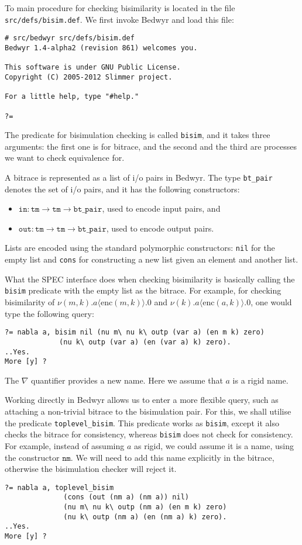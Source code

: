 \documentclass{article}
\newcommand\obj[1]{\texttt{#1}}
\begin{document}
To main procedure for checking bisimilarity is located in the file \obj{src/defs/bisim.def}.
We first invoke Bedwyr and load this file:
\begin{verbatim}
# src/bedwyr src/defs/bisim.def
Bedwyr 1.4-alpha2 (revision 861) welcomes you.

This software is under GNU Public License.
Copyright (C) 2005-2012 Slimmer project.

For a little help, type "#help."

?= 
\end{verbatim}
The predicate for bisimulation checking is called \texttt{bisim}, and it takes three
arguments: the first one is for bitrace, and the second and the third are processes
we want to check equivalence for. 

A bitrace is represented as a list of i/o pairs in Bedwyr. The type \texttt{bt\_pair}
denotes the set of i/o pairs, and it has the following constructors:
\begin{itemize}
\item $\obj{in} : \obj{tm} \to \obj{tm} \to \obj{bt\_pair}$, used to encode input pairs, and
\item $\obj{out} : \obj{tm} \to \obj{tm} \to \obj{bt\_pair}$, used to encode output pairs.
\end{itemize}
Lists are encoded using the standard polymorphic constructors: \obj{nil} for
the empty list and \obj{cons} for constructing a new list given an element and another list.

What the SPEC interface does when checking bisimilarity is basically calling the \obj{bisim}
predicate with the empty list as the bitrace.
For example, for checking bisimilarity of 
$\nu (m,k). a\langle \mathrm{enc}(m,k) \rangle.0$ and 
$\nu (k). a\langle \mathrm{enc}(a,k) \rangle.0$, one would type the following
query:
\begin{verbatim}
?= nabla a, bisim nil (nu m\ nu k\ outp (var a) (en m k) zero) 
             (nu k\ outp (var a) (en (var a) k) zero).
..Yes.
More [y] ? 
\end{verbatim}
The $\nabla$ quantifier provides a new name. Here we assume that $a$ is a rigid name. 

Working directly in Bedwyr allows us to enter a more flexible query, 
such as attaching a non-trivial bitrace to the bisimulation pair. 
For this, we shall utilise the predicate \obj{toplevel\_bisim}. This predicate
works as \obj{bisim}, except it also checks the bitrace for consistency, whereas
\obj{bisim} does not check for consistency. 
For example, instead of assuming $a$ as rigid, we could assume it is
a name, using the constructor $\obj{nm}.$ We will need to add this
name explicitly in the bitrace, otherwise the bisimulation checker will reject it. 
\begin{verbatim}
?= nabla a, toplevel_bisim 
              (cons (out (nm a) (nm a)) nil)  
              (nu m\ nu k\ outp (nm a) (en m k) zero) 
              (nu k\ outp (nm a) (en (nm a) k) zero).
..Yes.
More [y] ?
\end{verbatim}
\end{document}
